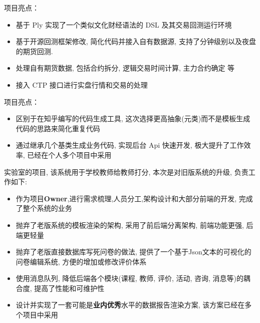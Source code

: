 \documentclass{resume}
\begin{document}
\begin{onehalfspacing}
项目亮点：
\begin{itemize}
  \item 基于 Ply 实现了一个类似文化财经语法的 DSL 及其交易回测运行环境
  \item 基于开源回测框架修改, 简化代码并接入自有数据源, 支持了分钟级别以及夜盘的期货回测.
  \item 处理自有期货数据, 包括合约拆分, 逻辑交易时间计算, 主力合约确定 等
  \item 接入 CTP 接口进行实盘行情和交易的处理
\end{itemize}
\end{onehalfspacing}


\begin{onehalfspacing}
项目亮点：
\begin{itemize}
  \item 区别于在知乎编写的代码生成工具, 这次选择更高抽象(元类)而不是模板生成代码的思路来简化重复代码
  \item 通过继承几个基类生成业务代码, 实现后台 Api 快速开发, 极大提升了工作效率, 已经在个人多个项目中采用
\end{itemize}
\end{onehalfspacing}


\begin{onehalfspacing}
实验室的项目, 该系统用于学校教师给教师打分, 本次是对旧版系统的升级, 负责工作如下:
\begin{itemize}
  \item 作为项目\textbf{Owner},进行需求梳理,人员分工,架构设计和大部分前端的开发, 完成了整个系统的业务
  \item 抛弃了老版系统的模板渲染的架构, 采用了前后端分离架构, 前端功能更强, 后端更轻量
  \item 抛弃了老版直接数据库写死问卷的做法, 提供了一个基于Json文本的可视化的问卷编辑系统, 方便的增加或修改评价体系
  \item 使用消息队列, 降低后端各个模块(课程, 教师, 评价, 活动, 咨询, 消息等)的耦合度, 提高了性能和可维护性
  \item 设计并实现了一套可能是\textbf{业内优秀}水平的数据报告渲染方案, 该方案已经在多个项目中采用 
\end{itemize}
\end{onehalfspacing}
\end{document}
